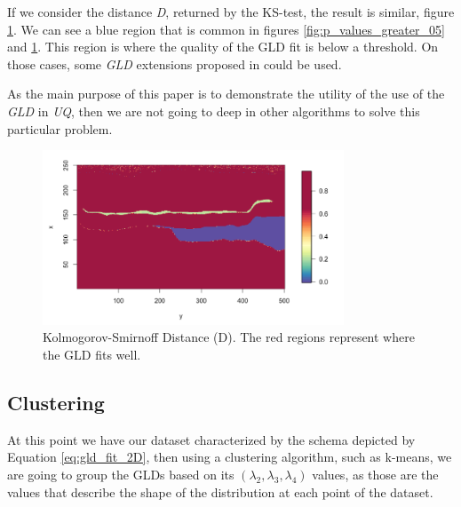 If we consider the distance \textit{D}, returned by the KS-test, the result is similar, figure \ref{fig:kolmogorov_distance}. We can see a blue region that is common in figures \ref{fig:p_values_greater_05} and \ref{fig:kolmogorov_distance}. This region is where the quality of the GLD fit is below a threshold. 
On those cases, some \textit{GLD} extensions proposed in \cite{Karian2011} could be used.

As the main purpose of this paper is to demonstrate the utility of the use of the \textit{GLD} in \textit{UQ}, then we are not going to deep in other algorithms to solve this particular problem.

\begin{figure}[H]
    \centering
    \includegraphics[width=0.8\textwidth]{images/kolmogorov_distance.png}
    \caption{Kolmogorov-Smirnoff Distance (D). The red regions represent where the GLD fits well.}
    \label{fig:kolmogorov_distance}
\end{figure}

\subsection{Clustering}\label{useCaseClustering}
At this point we have our dataset characterized by the schema depicted by Equation \ref{eq:gld_fit_2D}, then using a clustering algorithm, such as k-means, we are going to group the GLDs based on its $(\lambda_{2}, \lambda_{3}, \lambda_{4})$ values, as those are the values that describe the shape of the distribution at each point of the dataset.

